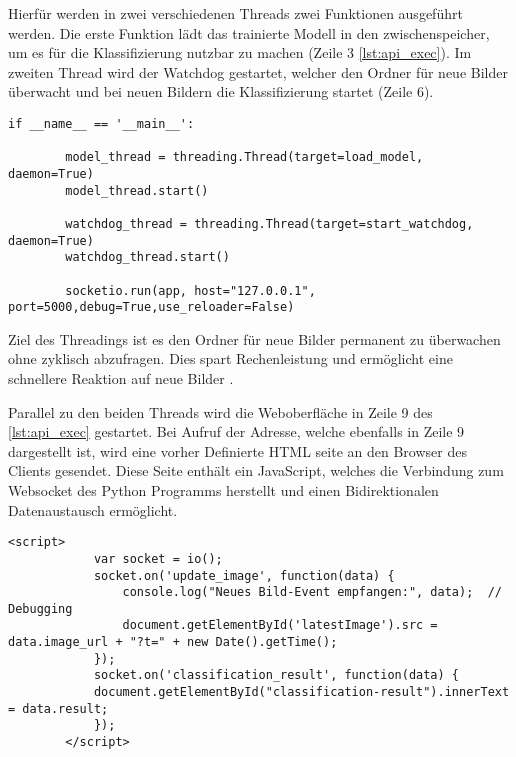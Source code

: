 Hierfür werden in zwei verschiedenen Threads zwei Funktionen ausgeführt werden. Die erste Funktion lädt das trainierte Modell in den zwischenspeicher, um es für die Klassifizierung nutzbar zu machen (Zeile 3 \autoref{lst:api_exec}). Im zweiten Thread wird der Watchdog gestartet, welcher den Ordner für neue Bilder überwacht und bei neuen Bildern die Klassifizierung startet (Zeile 6). 


\begin{lstlisting}[style=python, label=lst:api_exec, caption={Start der Weboberfläche und der Threads in der api.py}]
    if __name__ == '__main__':

        model_thread = threading.Thread(target=load_model, daemon=True)
        model_thread.start()

        watchdog_thread = threading.Thread(target=start_watchdog, daemon=True)
        watchdog_thread.start()

        socketio.run(app, host="127.0.0.1", port=5000,debug=True,use_reloader=False)

\end{lstlisting}

Ziel des Threadings ist es den Ordner für neue Bilder permanent zu überwachen ohne zyklisch abzufragen. Dies spart Rechenleistung und ermöglicht eine schnellere Reaktion auf neue Bilder \cite{noauthor_threading_nodate}.

Parallel zu den beiden Threads wird die Weboberfläche in Zeile 9 des \autoref{lst:api_exec} gestartet. Bei Aufruf der Adresse, welche ebenfalls in Zeile 9 dargestellt ist, wird eine vorher Definierte \ac{HTML} seite an den Browser des Clients gesendet. Diese Seite enthält ein JavaScript, welches die Verbindung zum Websocket des Python Programms herstellt und einen Bidirektionalen Datenaustausch ermöglicht.

\begin{lstlisting}[style=html, label=lst:weboberflaeche, caption={JavaScript Code der Weboberfläche, welcher die Bilder des Websockets empfängt}]
        <script>
            var socket = io();
            socket.on('update_image', function(data) {
                console.log("Neues Bild-Event empfangen:", data);  // Debugging
                document.getElementById('latestImage').src = data.image_url + "?t=" + new Date().getTime();
            });
            socket.on('classification_result', function(data) {
            document.getElementById("classification-result").innerText = data.result;
            });
        </script>

\end{lstlisting}

